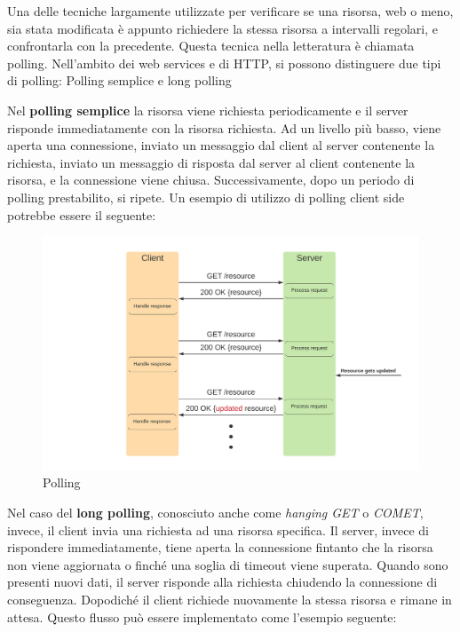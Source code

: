 \documentclass[12pt,a4paper,openright]{report}
\begin{document}
Una delle tecniche largamente utilizzate per verificare se una risorsa, web o meno, sia stata modificata è appunto richiedere la stessa risorsa a intervalli regolari, e confrontarla con la precedente. Questa tecnica nella letteratura è chiamata polling. Nell’ambito dei web services e di HTTP, si possono distinguere due tipi di polling: Polling semplice e long polling
\begin{description}
\item Nel \textbf{polling semplice} la risorsa viene richiesta periodicamente e il server risponde immediatamente con la risorsa richiesta. Ad un livello più basso, viene aperta una connessione, inviato un messaggio dal client al server contenente la richiesta, inviato un messaggio di risposta dal server al client contenente la risorsa, e la connessione viene chiusa. Successivamente, dopo un periodo di polling prestabilito, si ripete.
Un esempio di utilizzo di polling client side potrebbe essere il seguente:


\begin{figure}[htbp]
\centering
\includegraphics[width=.8\textwidth]{assets/polling.png}
\caption{Polling}
\end{figure}

\item Nel caso del \textbf{long polling}, conosciuto anche come \textit{hanging GET} o \textit{COMET}, invece, il client invia una richiesta ad una risorsa specifica. Il server, invece di rispondere immediatamente, tiene aperta la connessione fintanto che la risorsa non viene aggiornata o finché una soglia di timeout viene superata. Quando sono presenti nuovi dati, il server risponde alla richiesta chiudendo la connessione di conseguenza. Dopodiché il client richiede nuovamente la stessa risorsa e rimane in attesa.
Questo flusso può essere implementato come l'esempio seguente:



\end{description}
\end{document}
